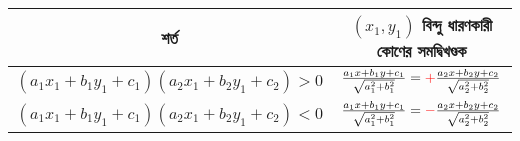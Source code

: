 \documentclass{article}
\begin{document}
\begin{tabular}{|c|c|}
	\hline 
	শর্ত	& $(x_1,y_1)$ বিন্দু  ধারণকারী কোণের সমদ্বিখণ্ডক  \\ 
	\hline  
	$(a_1x_1+b_1y_1+c_1)(a_2x_1+b_2y_1+c_2)>0$	& $\frac{a_1x+b_1y+c_1}{\sqrt{a_1^2+b_1^2}}=\textcolor{red}{+} \frac{a_2x+b_2y+c_2}{\sqrt{a_2^2+b_2^2}}$\\
	\hline 
	$(a_1x_1+b_1y_1+c_1)(a_2x_1+b_2y_1+c_2)<0$	& $\frac{a_1x+b_1y+c_1}{\sqrt{a_1^2+b_1^2}}=\textcolor{red}{-} \frac{a_2x+b_2y+c_2}{\sqrt{a_2^2+b_2^2}}$\\
	\hline 
\end{tabular}\\
\\ 
\end{document}
